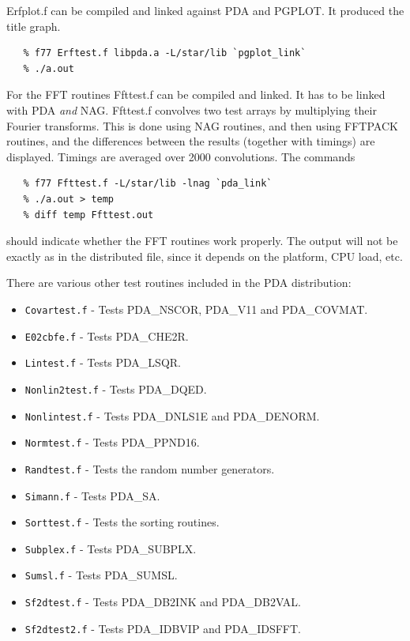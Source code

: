\documentclass[11pt,twoside]{article}
\begin{document}
   Erfplot.f can be compiled and linked against PDA and PGPLOT. It
   produced the title graph.

\begin{verbatim}
   % f77 Erftest.f libpda.a -L/star/lib `pgplot_link`
   % ./a.out
\end{verbatim}

   For the FFT routines Ffttest.f can be compiled and linked. It has to
   be linked with PDA {\em and\/} NAG. Ffttest.f convolves two
   test arrays by multiplying their Fourier transforms. This is done
   using NAG routines, and then using FFTPACK routines, and the
   differences between the results (together with timings) are
   displayed. Timings are averaged over 2000 convolutions. The commands

\begin{verbatim}
   % f77 Ffttest.f -L/star/lib -lnag `pda_link`
   % ./a.out > temp
   % diff temp Ffttest.out
\end{verbatim}

   should indicate whether the FFT routines work properly. The output
   will not be exactly as in the distributed file, since it depends on
   the platform, CPU load, etc.

   There are various other test routines included in the PDA distribution:
\begin{itemize}
\item {\tt Covartest.f} - Tests PDA\_NSCOR, PDA\_V11 and PDA\_COVMAT.
\item {\tt E02cbfe.f} - Tests PDA\_CHE2R.
\item {\tt Lintest.f} - Tests PDA\_LSQR.
\item {\tt Nonlin2test.f} - Tests PDA\_DQED.
\item {\tt Nonlintest.f} - Tests PDA\_DNLS1E and PDA\_DENORM.
\item {\tt Normtest.f} - Tests PDA\_PPND16.
\item {\tt Randtest.f} - Tests the random number generators.
\item {\tt Simann.f} - Tests PDA\_SA.
\item {\tt Sorttest.f} - Tests the sorting routines.
\item {\tt Subplex.f} - Tests PDA\_SUBPLX.
\item {\tt Sumsl.f} - Tests PDA\_SUMSL.
\item {\tt Sf2dtest.f} - Tests PDA\_DB2INK and PDA\_DB2VAL.
\item {\tt Sf2dtest2.f} - Tests PDA\_IDBVIP and PDA\_IDSFFT.
\end{itemize}
\end{document}
